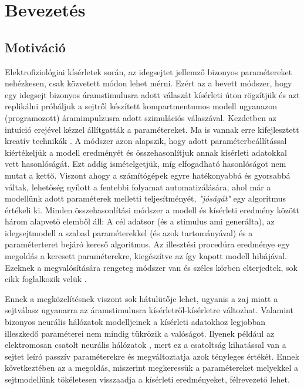 \section{Bevezetés}

\subsection{Motiváció}
Elektrofiziológiai kísérletek során, az idegsejtet jellemző bizonyos paramétereket nehézkesen, csak közvetett módon lehet mérni. Ezért az a bevett módszer, hogy egy idegsejt bizonyos áramstimulusra adott válaszát kísérleti úton rögzítjük és azt replikálni próbáljuk a sejtről készített kompartmentumos modell ugyanazon (programozott) áramimpulzusra adott szimulációs válaszával. Kezdetben az intuíció erejével kézzel állítgatták a paramétereket. Ma is vannak erre kifejlesztett kreatív technikák \cite{eichner2011hands}. A módszer azon alapszik, hogy adott paraméterbeállítással kiértékeljük a modell eredményét és összehasonlítjuk annak kísérleti adatokkal vett hasonlóságát. Ezt addig ismételgetjük, míg elfogadható hasonlóságot nem mutat a kettő. Viszont ahogy a számítógépek egyre hatékonyabbá és gyorsabbá váltak, lehetőség nyílott a fentebbi folyamat automatizálására, ahol már a modellünk adott paraméterek melletti teljesítményét, \textit{"jóságát"} egy algoritmus értékeli ki. Minden összehasonlítási módszer a modell és kísérleti eredmény között három alapvető elemből áll:
A cél adatsor (és a stimulus ami generálta), az idegsejtmodell a szabad paraméterekkel (és azok tartományával) és a paraméterteret bejáró kereső algoritmus. Az illesztési procedúra eredménye egy megoldás a keresett paraméterekre, kiegészítve az így kapott modell hibájával. Ezeknek a megvalósítására rengeteg módszer van és széles körben elterjedtek, sok cikk foglalkozik velük \cite{druckmann2007novel}\cite{van2007neurofitter}\cite{van2008automated}.

 Ennek a megközelítésnek viszont sok hátulütője lehet, ugyanis a zaj miatt a sejtválasz ugyanarra az áramstimulusra kísérletről-kísérletre változhat. Valamint bizonyos neurális hálózatok modelljeinek a kísérleti adatokhoz legjobban illeszkedő paraméterei nem mindig tükrözik a valóságot. Ilyenek például az elektromosan csatolt neurális hálózatok \cite{amsalem2016neuron}\cite{szoboszlay2016functional}, mert ez a csatoltság kihatással van a sejtet leíró passzív paraméterekre és megváltoztatja azok tényleges értékét. Ennek következtében az a megoldás, miszerint megkeressük a paramétereket melyekkel a sejtmodellünk tökéletesen visszaadja a kísérleti eredményeket, félrevezető lehet.

